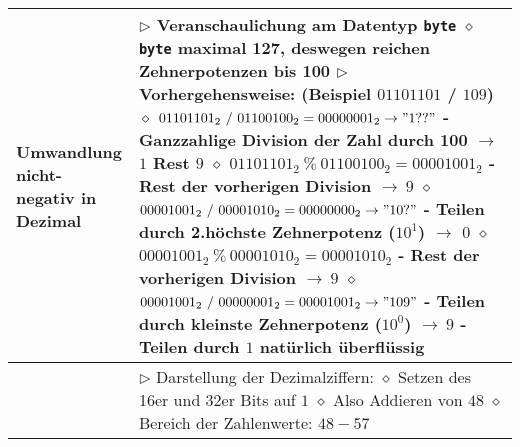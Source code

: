 \begin{longtable}{ | p{} p{} | }
	\makecell[l]{Umwandlung nicht- \\ negativ in Dezimal} & \makecell[l]{
	$\rhd$ Veranschaulichung am Datentyp \texttt{byte} \\
	\hspace{0.4cm} $\diamond$ \texttt{byte} maximal 127, deswegen reichen Zehnerpotenzen bis 100 \\
	$\rhd$ Vorhergehensweise: (Beispiel $01101101$ / $109$) \\
	\hspace{0.4cm} $\diamond$ $01101101_2~/~01100100_2=00000001_2 \rightarrow "1??"$ \\
	\hspace{0.6cm} - Ganzzahlige Division der Zahl durch 100 $\rightarrow$ $1$ Rest $9$ \\
	\hspace{0.4cm} $\diamond$ $01101101_2~\%~01100100_2=00001001_2$ \\
	\hspace{0.6cm} - Rest der vorherigen Division $\rightarrow~9$ \\
	\hspace{0.4cm} $\diamond$ $00001001_2~/~00001010_2=00000000_2 \rightarrow "10?"$ \\
	\hspace{0.6cm} - Teilen durch 2.höchste Zehnerpotenz ($10^1$) $\rightarrow$ $0$ \\
	\hspace{0.4cm} $\diamond$ $00001001_2~\%~00001010_2=00001010_2$ \\
	\hspace{0.6cm} - Rest der vorherigen Division $\rightarrow~9$ \\
	\hspace{0.4cm} $\diamond$ $00001001_2~/~00000001_2=00001001_2 \rightarrow "109"$ \\
	\hspace{0.6cm} - Teilen durch kleinste Zehnerpotenz ($10^0$) $\rightarrow~9$ \\
	\hspace{0.6cm} - Teilen durch $1$ natürlich überflüssig} \\ \hline

	\makecell[l]{Unicode-Kodierung} & \makecell[l]{
	$\rhd$ Darstellung der Dezimalziffern: \\
	\hspace{0.4cm} $\diamond$ Setzen des 16er und 32er Bits auf $1$ \\
	\hspace{0.4cm} $\diamond$ Also Addieren von $48$ \\
	\hspace{0.4cm} $\diamond$ Bereich der Zahlenwerte: $48-57$} \\ \hline


\end{longtable}
